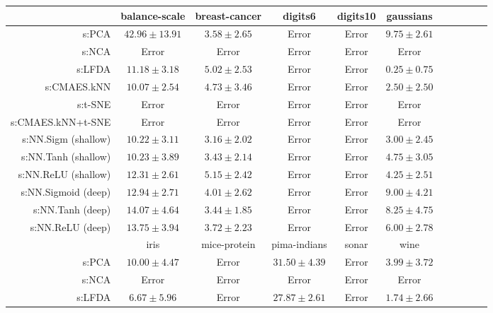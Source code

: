 \begin{table}[ht] \centering
{\small\renewcommand{\arraystretch}{0.95}
\setlength{\tabcolsep}{1pt}
\begin{tabular}{rcccccccccc}
\toprule


& \multicolumn{1}{c}{balance-scale} & \multicolumn{1}{c}{breast-cancer} & \multicolumn{1}{c}{digits6} & \multicolumn{1}{c}{digits10} & \multicolumn{1}{c}{gaussians} \\ 
\midrule
s:PCA & $42.96\pm13.91$ & $3.58\pm2.65$ & Error  & Error  & $9.75\pm2.61$ \\
s:NCA & Error  & Error  & Error  & Error  & Error  \\
s:LFDA & $11.18\pm3.18$ & $5.02\pm2.53$ & Error  & Error  & $\bm{0.25\pm0.75}$ \\
s:CMAES.kNN & $\bm{10.07\pm2.54}$ & $4.73\pm3.46$ & Error  & Error  & $2.50\pm2.50$ \\
s:t-SNE & Error  & Error  & Error  & Error  & Error  \\
s:CMAES.kNN+t-SNE & Error  & Error  & Error  & Error  & Error  \\
s:NN.Sigm (shallow) & $10.22\pm3.11$ & $\bm{3.16\pm2.02}$ & Error  & Error  & $3.00\pm2.45$ \\
s:NN.Tanh (shallow) & $10.23\pm3.89$ & $3.43\pm2.14$ & Error  & Error  & $4.75\pm3.05$ \\
s:NN.ReLU (shallow) & $12.31\pm2.61$ & $5.15\pm2.42$ & Error  & Error  & $4.25\pm2.51$ \\
s:NN.Sigmoid (deep) & $12.94\pm2.71$ & $4.01\pm2.62$ & Error  & Error  & $9.00\pm4.21$ \\
s:NN.Tanh (deep) & $14.07\pm4.64$ & $3.44\pm1.85$ & Error  & Error  & $8.25\pm4.75$ \\
s:NN.ReLU (deep) & $13.75\pm3.94$ & $3.72\pm2.23$ & Error  & Error  & $6.00\pm2.78$ \\
\midrule
& \multicolumn{1}{c}{iris} & \multicolumn{1}{c}{mice-protein} & \multicolumn{1}{c}{pima-indians} & \multicolumn{1}{c}{sonar} & \multicolumn{1}{c}{wine} \\ 
\midrule
s:PCA & $10.00\pm4.47$ & Error  & $31.50\pm4.39$ & Error  & $3.99\pm3.72$ \\
s:NCA & Error  & Error  & Error  & Error  & Error  \\
s:LFDA & $6.67\pm5.96$ & Error  & $27.87\pm2.61$ & Error  & $\bm{1.74\pm2.66}$ \\

\end{tabular}}
\end{table}
